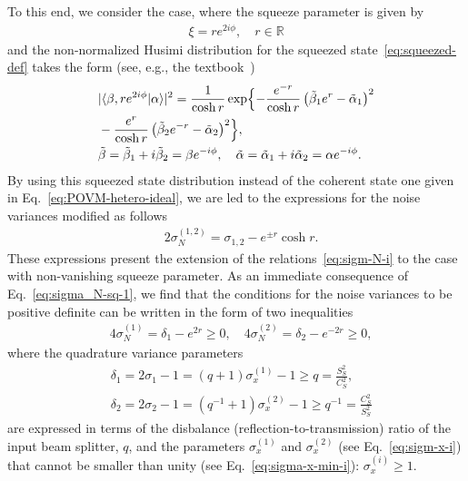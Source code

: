 \documentclass[%
reprint,
superscriptaddress,
 amsmath,amssymb,amsfonts,
 aps,
 pra,
 longbibliography
]{revtex4-2}
\begin{document}
To this end, we consider the case, where
the squeeze parameter is given by
\begin{align}
  \label{eq:sq-param}
  \xi=r e^{2 i \phi},\quad
  r\in\mathbb{R}
\end{align}
and the non-normalized Husimi distribution
for the squeezed state~\eqref{eq:squeezed-def} takes
the form
(see, e.g., the textbook~\cite{Gerry:bk:2005})
\begin{align}
\label{eq:squeezed-Q}
  &
    |\langle\beta,r e^{2 i \phi}|\alpha\rangle|^2=\frac{1}{\cosh r}
    \exp\Bigl\{-
    \frac{e^{-r}}{\cosh r}{}
    \left(\tilde{\beta}_1e^{r}-\tilde{\alpha}_1\right)^2
    \notag
  \\
    &-\frac{e^{r}}{\cosh r}{}\left(\tilde{\beta}_2e^{{-r}}-\tilde{\alpha}_2\right)^2
      \Bigr\},
  \\
  &
    \label{eq:tbeta-alpha}
    \tilde{\beta}=\tilde{\beta}_1+ i \tilde{\beta}_2=\beta e^{-i\phi},
    \quad
    \tilde{\alpha}=\tilde{\alpha}_1+ i \tilde{\alpha}_2=\alpha e^{-i\phi}.
\end{align}
By using
this squeezed state distribution instead
of the coherent state one 
given in Eq.~\eqref{eq:POVM-hetero-ideal},
we are led to the expressions for
the noise variances modified as follows
\begin{align}
  \label{eq:sigma_N-sq-1}
  &
    2\sigma_N^{(1,2)}=\sigma_{1,2}-e^{\pm r}\cosh r.
\end{align}
These expressions present the
extension of the relations~\eqref{eq:sigm-N-i}
to the case with non-vanishing squeeze parameter.
As an immediate consequence of Eq.~\eqref{eq:sigma_N-sq-1},
we find that
the conditions for the noise variances to be positive definite
can be written in the form of two inequalities 
\begin{align}
  \label{eq:sigma_N-sq-2}
  &
    4\sigma_N^{(1)}=\delta_1-e^{2r}\ge 0,
    \quad
    4\sigma_N^{(2)}=\delta_2-e^{-2r}\ge 0,
\end{align}
where the quadrature variance parameters
\begin{subequations}
  \label{eq:delta_12}
\begin{align}
  \label{eq:delta_1}
  &
    \delta_1=2\sigma_1-1=(q+1)\sigma_x^{(1)}-1\ge q=\frac{S_S^2}{C_S^2},
  \\
  &
    \label{eq:delta_2}
    \delta_2=2\sigma_2-1=(q^{-1}+1)\sigma_x^{(2)}-1\ge q^{-1}=\frac{C_S^2}{S_S^2}
\end{align}
\end{subequations}
are expressed in terms of
the disbalance
(reflection-to-transmission)
ratio of the input beam splitter, $q$,
and the parameters $\sigma_{x}^{(1)}$
and $\sigma_{x}^{(2)}$
(see Eq.~\eqref{eq:sigm-x-i})
that cannot be smaller than unity
(see Eq.~\eqref{eq:sigma-x-min-i}): $\sigma_x^{(i)}\ge 1$.
\end{document}
